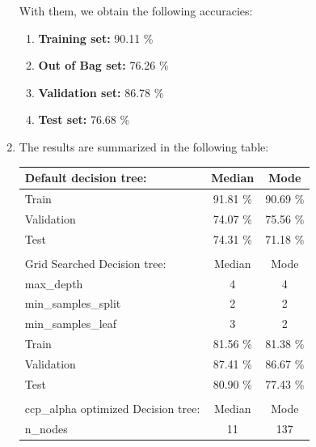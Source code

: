 \documentclass[12pt]{article}
\begin{document}
\begin{enumerate}[label=(\alph*)]
    With them, we obtain the following accuracies:
    \begin{enumerate}[label=(\roman*)]
        \item \textbf{Training set:} 90.11 \%
        \item \textbf{Out of Bag set:} 76.26 \%
        \item \textbf{Validation set:} 86.78 \%
        \item \textbf{Test set:} 76.68 \%
    \end{enumerate}

    \item The results are summarized in the following table:

    \begin{center}
    \begin{tabular}{l c c}
        Default decision tree: & Median & Mode \\
        \hline
        \hspace{3mm} Train & 91.81 \% & 90.69 \% \\
        \hspace{3mm} Validation & 74.07 \% & 75.56 \% \\
        \hspace{3mm} Test & 74.31 \% & 71.18 \% \\
             & & \\
        Grid Searched Decision tree: & Median & Mode \\
        \hline
        \hspace{3mm} max\_depth & 4 & 4 \\
        \hspace{3mm} min\_samples\_split \hspace{30mm} & 2 & 2 \\ %
        \hspace{3mm} min\_samples\_leaf & 3 & 2 \\
        \hspace{3mm} Train & 81.56 \% & 81.38 \% \\
        \hspace{3mm} Validation & 87.41 \% & 86.67 \% \\
        \hspace{3mm} Test & 80.90 \% & 77.43 \% \\
            & & \\
        ccp\_alpha optimized Decision tree: & Median & Mode \\
        \hline
        \hspace{3mm} n\_nodes & 11 & 137 \\

\end{tabular}
\end{center}
\end{enumerate}
\end{document}
